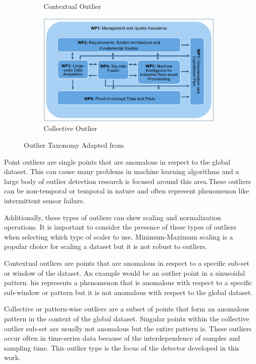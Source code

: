 \begin{figure}[H]
\begin{subfigure}[b]{0.3\textwidth}
         \caption{Contextual Outlier}
         \label{fig:seasonal}
     \end{subfigure}
     \hfill
     \begin{subfigure}[b]{0.3\textwidth}
         \centering
         \includegraphics[width=\textwidth]{Images/FIREMAN_pert_diagram.png}
         \caption{Collective Outlier}
         \label{fig:trend}
     \end{subfigure}
        \caption{Outlier Taxonomy Adapted from \cite{lai2021revisiting}}
        \label{fig:outliers-graphic}
\end{figure}


Point outliers are single points that are anomalous in respect to the global dataset. This can cause many problems in machine learning algorithms and a large body of outlier detection research is focused around this area.These outliers can be non-temporal or temporal in nature and often represent phenomenon like intermittent sensor failure. 

Additionally, these types of outliers can skew scaling and normalization operations. It is important to consider the presence of these types of outliers when selecting which type of scaler to use. Minimum-Maximum scaling is a popular choice for scaling a dataset but it is not robust to outliers. 

Contextual outliers are points that are anomalous in respect to a specific sub-set or window of the dataset. An example would be an outlier point in a sinusoidal pattern. his represents a phenomenon that is anomalous with respect to a specific sub-window or pattern but it is not anomalous with respect to the global dataset. 

Collective or pattern-wise outliers are a subset of points that form an anomalous pattern in the context of the global dataset. Singular points within the collective outlier sub-set are usually not anomalous but the entire pattern is. These outliers occur often in time-series data because of the interdependence of samples and sampling time. This outlier type is the focus of the detector developed in this work.

